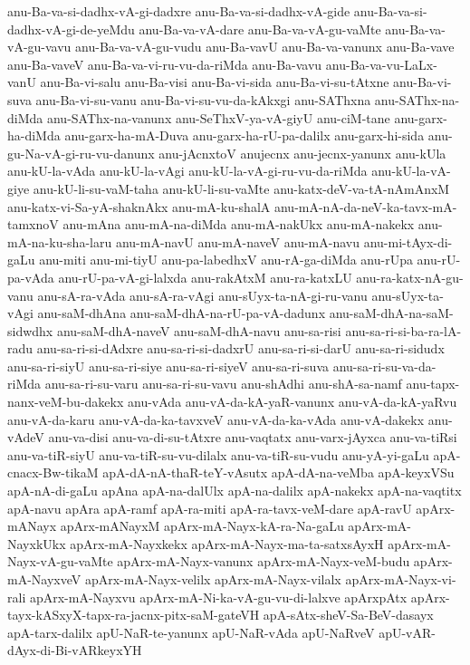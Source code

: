 {anu-Ba-va-si-dadhx-vA-gi-dadxre
anu-Ba-va-si-dadhx-vA-gide
anu-Ba-va-si-dadhx-vA-gi-de-yeMdu
anu-Ba-va-vA-dare
anu-Ba-va-vA-gu-vaMte
anu-Ba-va-vA-gu-vavu
anu-Ba-va-vA-gu-vudu
anu-Ba-vavU
anu-Ba-va-vanunx
anu-Ba-vave
anu-Ba-vaveV
anu-Ba-va-vi-ru-vu-da-riMda
anu-Ba-vavu
anu-Ba-va-vu-LaLx-vanU
anu-Ba-vi-salu
anu-Ba-visi
anu-Ba-vi-sida
anu-Ba-vi-su-tAtxne
anu-Ba-vi-suva
anu-Ba-vi-su-vanu
anu-Ba-vi-su-vu-da-kAkxgi
anu-SAThxna
anu-SAThx-na-diMda
anu-SAThx-na-vanunx
anu-SeThxV-ya-vA-giyU
anu-ciM-tane
anu-garx-ha-diMda
anu-garx-ha-mA-Duva
anu-garx-ha-rU-pa-dalilx
anu-garx-hi-sida
anu-gu-Na-vA-gi-ru-vu-danunx
anu-jAcnxtoV
anujecnx
anu-jecnx-yanunx
anu-kUla
anu-kU-la-vAda
anu-kU-la-vAgi
anu-kU-la-vA-gi-ru-vu-da-riMda
anu-kU-la-vA-giye
anu-kU-li-su-vaM-taha
anu-kU-li-su-vaMte
anu-katx-deV-va-tA-nAmAnxM
anu-katx-vi-Sa-yA-shaknAkx
anu-mA-ku-shalA
anu-mA-nA-da-neV-ka-tavx-mA-tamxnoV
anu-mAna
anu-mA-na-diMda
anu-mA-nakUkx
anu-mA-nakekx
anu-mA-na-ku-sha-laru
anu-mA-navU
anu-mA-naveV
anu-mA-navu
anu-mi-tAyx-di-gaLu
anu-miti
anu-mi-tiyU
anu-pa-labedhxV
anu-rA-ga-diMda
anu-rUpa
anu-rU-pa-vAda
anu-rU-pa-vA-gi-lalxda
anu-rakAtxM
anu-ra-katxLU
anu-ra-katx-nA-gu-vanu
anu-sA-ra-vAda
anu-sA-ra-vAgi
anu-sUyx-ta-nA-gi-ru-vanu
anu-sUyx-ta-vAgi
anu-saM-dhAna
anu-saM-dhA-na-rU-pa-vA-dadunx
anu-saM-dhA-na-saM-sidwdhx
anu-saM-dhA-naveV
anu-saM-dhA-navu
anu-sa-risi
anu-sa-ri-si-ba-ra-lA-radu
anu-sa-ri-si-dAdxre
anu-sa-ri-si-dadxrU
anu-sa-ri-si-darU
anu-sa-ri-sidudx
anu-sa-ri-siyU
anu-sa-ri-siye
anu-sa-ri-siyeV
anu-sa-ri-suva
anu-sa-ri-su-va-da-riMda
anu-sa-ri-su-varu
anu-sa-ri-su-vavu
anu-shAdhi
anu-shA-sa-namf
anu-tapx-nanx-veM-bu-dakekx
anu-vAda
anu-vA-da-kA-yaR-vanunx
anu-vA-da-kA-yaRvu
anu-vA-da-karu
anu-vA-da-ka-tavxveV
anu-vA-da-ka-vAda
anu-vA-dakekx
anu-vAdeV
anu-va-disi
anu-va-di-su-tAtxre
anu-vaqtatx
anu-varx-jAyxca
anu-va-tiRsi
anu-va-tiR-siyU
anu-va-tiR-su-vu-dilalx
anu-va-tiR-su-vudu
anu-yA-yi-gaLu
apA-cnacx-Bw-tikaM
apA-dA-nA-thaR-teY-vAsutx
apA-dA-na-veMba
apA-keyxVSu
apA-nA-di-gaLu
apAna
apA-na-dalUlx
apA-na-dalilx
apA-nakekx
apA-na-vaqtitx
apA-navu
apAra
apA-ramf
apA-ra-miti
apA-ra-tavx-veM-dare
apA-ravU
apArx-mANayx
apArx-mANayxM
apArx-mA-Nayx-kA-ra-Na-gaLu
apArx-mA-NayxkUkx
apArx-mA-Nayxkekx
apArx-mA-Nayx-ma-ta-satxsAyxH
apArx-mA-Nayx-vA-gu-vaMte
apArx-mA-Nayx-vanunx
apArx-mA-Nayx-veM-budu
apArx-mA-NayxveV
apArx-mA-Nayx-velilx
apArx-mA-Nayx-vilalx
apArx-mA-Nayx-vi-rali
apArx-mA-Nayxvu
apArx-mA-Ni-ka-vA-gu-vu-di-lalxve
apArxpAtx
apArx-tayx-kASxyX-tapx-ra-jacnx-pitx-saM-gateVH
apA-sAtx-sheV-Sa-BeV-dasayx
apA-tarx-dalilx
apU-NaR-te-yanunx
apU-NaR-vAda
apU-NaRveV
apU-vAR-dAyx-di-Bi-vARkeyxYH
}
